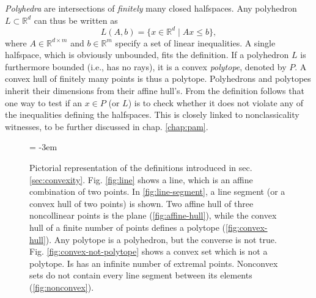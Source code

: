 		\emph{Polyhedra} are intersections of \emph{finitely} many closed halfspaces. Any polyhedron $L \subset \mathbb{R}^d$ can thus be written as
		$$
			L(A, b) = \big\{ x \in \mathbb{R}^d \mid Ax \leq b \big\} ,
		$$
		where $A \in \mathbb{R}^{d \times m}$ and $b \in \mathbb{R}^m$ specify a set of linear inequalities. A single halfspace, which is obviously unbounded, fits the definition. If a polyhedron $L$ is furthermore bounded (i.e., has no rays), it is a convex \emph{polytope}, denoted by $P$. A convex hull of finitely many points is thus a polytope. Polyhedrons and polytopes inherit their dimensions from their affine hull's. From the definition follows that one way to test if an $x \in P$ (or $L$) is to check whether it does not violate any of the inequalities defining the halfspaces. This is closely linked to nonclassicality witnesses, to be further discussed in chap. \ref{chap:pam}.
		\begin{figure*}[t!]
			\newdimen\subfigcapmargin  \subfigcapmargin  =  -3em
			\centering
			\begin{minipage}{.8\textwidth}
				\hfill
				\hfill
	
				\hfill
				\hfill
			\end{minipage}
			\caption{Pictorial representation of the definitions introduced in sec. \ref{sec:convexity}. Fig. \ref{fig:line} shows a line, which is an affine combination of two points. In \ref{fig:line-segment}, a line segment (or a convex hull of two points) is shown. Two affine hull of three noncollinear points is the plane (\ref{fig:affine-hull}), while the convex hull of a finite number of points defines a polytope (\ref{fig:convex-hull}). Any polytope is a polyhedron, but the converse is not true. Fig. \ref{fig:convex-not-polytope} shows a convex set which is not a polytope. Is has an infinite number of extremal points. Nonconvex sets do not contain every line segment between its elements (\ref{fig:nonconvex}).}
		\end{figure*}



